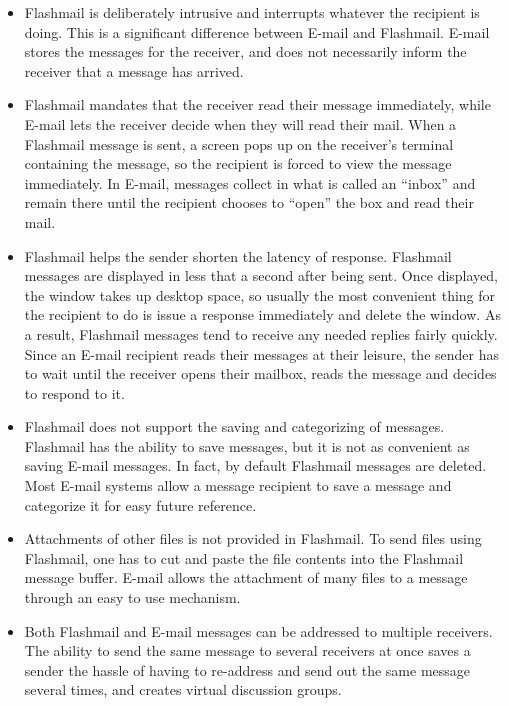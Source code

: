 \begin{itemize}
\item Flashmail is deliberately intrusive and interrupts whatever the
  recipient is doing.  This is a significant difference between E-mail and
  Flashmail.  E-mail stores the messages for the receiver, and does not
  necessarily inform the receiver that a message has arrived.

\item Flashmail mandates that the receiver read their message immediately,
  while E-mail lets the receiver decide when they will read their mail.
  When a Flashmail message is sent, a screen pops up on the receiver's
  terminal containing the message, so the recipient is forced to view the
  message immediately.  In E-mail, messages collect in what is called an
  ``inbox'' and remain there until the recipient chooses to ``open'' the
  box and read their mail.

\item Flashmail helps the sender shorten the latency of response.
  Flashmail messages are displayed in less that a second after being sent.
  Once displayed, the window takes up desktop space, so usually the most convenient
  thing for the recipient to do is issue a response immediately and
  delete the window.  As a result, Flashmail messages tend to receive any
  needed replies fairly quickly.  Since an E-mail recipient
  reads their messages at their leisure, the sender has to wait until the
  receiver opens their mailbox, reads the message and decides to respond to
  it.

\item Flashmail does not support the saving and categorizing of
  messages.  Flashmail has the ability to save messages, but it is not as
  convenient as saving E-mail messages. In fact, by default Flashmail messages
  are deleted.  Most E-mail systems allow a message recipient to
  save a message and categorize it for easy future reference.

\item Attachments of other files is not provided in Flashmail. To send
  files using Flashmail, one has to cut and paste the file contents into
  the Flashmail message buffer. E-mail allows the attachment of many files
  to a message through an easy to use mechanism.

\item Both Flashmail and E-mail messages can be addressed to multiple
  receivers. The ability to send the same message to several receivers at
  once saves a sender the hassle of having to re-address and send out the
  same message several times, and creates virtual discussion groups.


\end{itemize}
